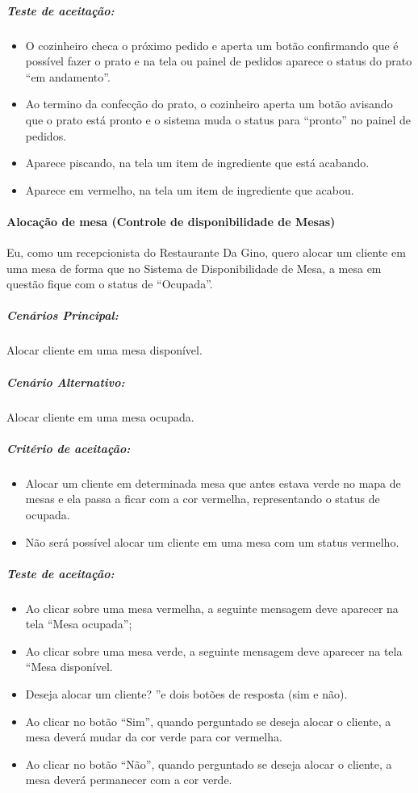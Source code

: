 \subparagraph{Teste de aceitação:}

\begin{itemize}
\item O cozinheiro checa o próximo pedido e aperta um botão confirmando que é possível fazer o prato e na tela ou painel de pedidos aparece o status do prato “em andamento”. 
\item Ao termino da confecção do prato, o cozinheiro aperta um botão avisando que o prato está pronto e o sistema muda o  status para “pronto” no painel de pedidos.
\item Aparece piscando, na tela um item de ingrediente que está acabando.
\item Aparece em vermelho,  na tela um item de ingrediente que acabou.
\end{itemize}

\paragraph{Alocação de mesa (Controle de disponibilidade de Mesas)}

Eu, como um recepcionista do Restaurante Da Gino, quero alocar um cliente em uma mesa de forma que no Sistema de Disponibilidade de Mesa, a mesa em questão fique com o status de “Ocupada”.

\subparagraph{Cenários Principal:}

Alocar cliente em uma mesa disponível.

\subparagraph{Cenário Alternativo:}

Alocar cliente em uma mesa ocupada.

\subparagraph{Critério de aceitação:}

\begin{itemize}
\item Alocar um cliente em determinada mesa que antes estava verde no mapa de mesas e ela passa a ficar com a cor vermelha, representando o status de ocupada.
\item Não será possível alocar um cliente em uma mesa com um status vermelho.
\end{itemize}

\subparagraph{Teste de aceitação:}

\begin{itemize}
\item Ao clicar sobre uma mesa vermelha, a seguinte mensagem deve aparecer na tela “Mesa ocupada”;
\item Ao clicar sobre uma mesa verde, a seguinte mensagem deve aparecer na tela “Mesa disponível. \item Deseja alocar um cliente? ”e dois botões de resposta (sim e não).
\item Ao clicar no botão “Sim”, quando perguntado se deseja alocar o cliente, a mesa deverá mudar da cor verde para cor vermelha.
\item Ao clicar no botão “Não”, quando perguntado se deseja alocar o cliente, a mesa deverá permanecer com a cor verde.
\end{itemize}


